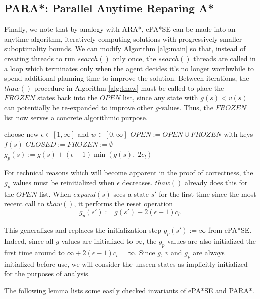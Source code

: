 \documentclass[letterpaper]{article}
\begin{document}
\subsection{PARA*: Parallel Anytime Reparing A*}

Finally, we note that by analogy with ARA*, ePA*SE can be made into an anytime algorithm, iteratively computing solutions with progressively smaller suboptimality bounds. We can modify Algorithm \ref{alg:main} so that, instead of creating threads to run $search()$ only once, the $search()$ threads are called in a loop which terminates only when the agent decides it's no longer worthwhile to spend additional planning time to improve the solution. Between iterations, the $thaw()$ procedure in Algorithm \ref{alg:thaw} must be called to place the $FROZEN$ states back into the $OPEN$ list, since any state with $g(s) < v(s)$ can potentially be re-expanded to improve other $g$-values. Thus, the $FROZEN$ list now serves a concrete algorithmic purpose.

\begin{algorithm}
\caption{$thaw()$}
\label{alg:thaw}
\begin{algorithmic}
\STATE choose new $\epsilon \in [1,\infty]$ and $w \in [0,\infty]$
\STATE $OPEN := OPEN \cup FROZEN$ with keys $f(s)$
\STATE $CLOSED := FROZEN := \emptyset$
\STATE $g_p(s) := g(s) + (\epsilon-1)\min(g(s),\;2c_l)$
\ENDFOR
\end{algorithmic}
\end{algorithm}

For technical reasons which will become apparent in the proof of correctness, the $g_p$ values must be reinitialized when $\epsilon$ decreases. $thaw()$ already does this for the $OPEN$ list. When $expand(s)$ sees a state $s'$ for the first time since the most recent call to $thaw()$, it performs the reset operation
\[g_p(s') := g(s') + 2(\epsilon-1)c_l.\]

This generalizes and replaces the initialization step $g_p(s') := \infty$ from ePA*SE. Indeed, since all $g$-values are initialized to $\infty$, the $g_p$ values are also initialized the first time around to $\infty +2(\epsilon-1)c_l = \infty$. Since $g$, $v$ and $g_p$ are always initialized before use, we will consider the unseen states as implicitly initialized for the purposes of analysis.

The following lemma lists some easily checked invariants of ePA*SE and PARA*.
\end{document}

